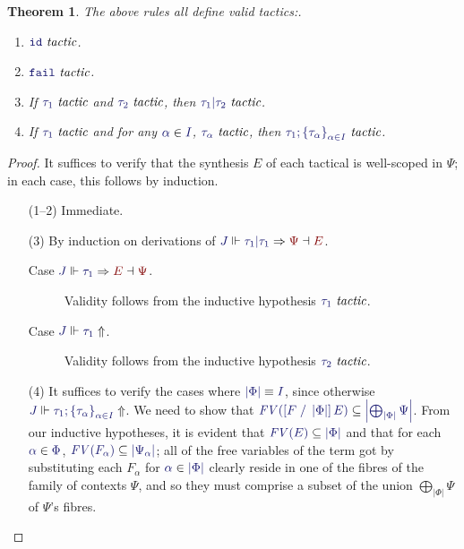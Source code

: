 \documentclass[11pt]{article}
\newtheorem{thm}{Theorem}[section]
\theoremstyle{definition}
\theoremstyle{remark}
\numberwithin{equation}{section}
\def\IModeColorName{MidnightBlue}
\def\OModeColorName{Maroon}
\newcommand\IMode[1]{{\color{\IModeColorName}{#1}}}
\newcommand\OMode[1]{{\color{\OModeColorName}{#1}}}
\newcommand\JJ{J}
\newcommand\IsTac[1]{\IMode{#1}\ \textit{tactic}}
\newcommand\MkSet[1]{\left\{#1\right\}}
\newcommand\MkFam[3]{\MkSet{#1_{#2}}_{#2\in #3}}
\newcommand\Refine[4]{\IMode{#1}\Vdash\IMode{#2}\Rightarrow\OMode{#4}\dashv\OMode{#3}}
\newcommand\NoRefine[2]{\IMode{#1}\Vdash\IMode{#2}\Uparrow}
\newcommand\Member[2]{\IMode{#1}\in\IMode{#2}}
\newcommand\IdTac{\mathtt{id}}
\newcommand\FailTac{\mathtt{fail}}
\newcommand\OrElseTac[2]{#1\vert#2}
\newcommand\ThenTac[2]{#1;#2}
\newcommand\Dom[1]{\left\vert#1\right\vert}
\newcommand\SubsetEq[2]{\IMode{#1}\subseteq\IMode{#2}}
\newcommand\FV[1]{\textit{FV}\left(#1\right)}
\newcommand\Subst[3]{\left[#1\;/\;#2\right]#3}
\newcommand\IsEquiv[2]{\IMode{#1}\equiv\IMode{#2}}
\begin{document}
\begin{thm}
  The above rules all define valid tactics:.
  \begin{enumerate}
    \item $\IsTac{\IdTac}$.
    \item $\IsTac{\FailTac}$.
    \item If $\IsTac{\tau_1}$ and $\IsTac{\tau_2}$, then
      $\IsTac{\OrElseTac{\tau_1}{\tau_2}}$.

    \item If $\IsTac{\tau_1}$ and for any $\Member{\alpha}{I}$,
      $\IsTac{\tau_\alpha}$, then
      $\IsTac{\ThenTac{\tau_1}{\MkFam{\tau}{\alpha}{I}}}$.

  \end{enumerate}
\end{thm}
\begin{proof}
  It suffices to verify that the synthesis $E$ of each tactical is well-scoped
  in $\Psi$; in each case, this follows by induction.
  \begin{enumerate}
    \item[(1--2)] Immediate.
    \item[(3)]
      By induction on derivations of
      $\Refine{\JJ}{\OrElseTac{\tau_1}{\tau_1}}{E}{\Psi}$.
      \begin{description}
        \item[Case $\Refine{\JJ}{\tau_1}{\Psi}{E}$.] Validity follows from the
          inductive hypothesis $\IsTac{\tau_1}$.
        \item[Case $\NoRefine{\JJ}{\tau_1}$.] Validity follows from the
          inductive hypothesis $\IsTac{\tau_2}$.
      \end{description}

    \item[(4)] It suffices to verify the cases where
      $\IsEquiv{\Dom\Phi}{I}$, since otherwise
      $\NoRefine{\JJ}{\ThenTac{\tau_1}{\MkFam{\tau}{\alpha}{I}}}$.
      We need to show that
      $\SubsetEq{\FV{\Subst{F}{\Dom\Phi}{E}}}{\Dom{\bigoplus_{\Dom\Phi}\Psi}}$.
      From our inductive hypotheses, it is evident that
      $\SubsetEq{\FV{E}}{\Dom\Phi}$ and that for each $\Member{\alpha}{\Phi}$,
      $\SubsetEq{\FV{F_\alpha}}{\Dom{\Psi_\alpha}}$; all of the free variables
      of the term got by substituting each $F_\alpha$ for
      $\Member{\alpha}{\Dom\Phi}$ clearly reside in one of the fibres of the
      family of contexts $\Psi$, and so they must comprise a subset of the
      union $\bigoplus_{\Dom\Phi}\Psi$ of $\Psi$'s fibres.

  \end{enumerate}
\end{proof}
\end{document}
